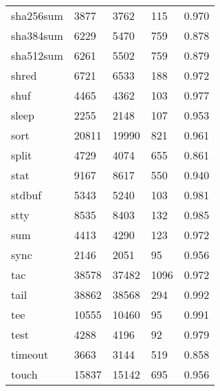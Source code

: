 \begin{longtable}{lp{3.0cm}p{3.0cm}p{3.0cm}p{3.0cm}}
sha256sum &                     3877 &         3762 &           115 &                    0.970 \\
sha384sum &                     6229 &         5470 &           759 &                    0.878 \\
sha512sum &                     6261 &         5502 &           759 &                    0.879 \\
shred     &                     6721 &         6533 &           188 &                    0.972 \\
shuf      &                     4465 &         4362 &           103 &                    0.977 \\
sleep     &                     2255 &         2148 &           107 &                    0.953 \\
sort      &                    20811 &        19990 &           821 &                    0.961 \\
split     &                     4729 &         4074 &           655 &                    0.861 \\
stat      &                     9167 &         8617 &           550 &                    0.940 \\
stdbuf    &                     5343 &         5240 &           103 &                    0.981 \\
stty      &                     8535 &         8403 &           132 &                    0.985 \\
sum       &                     4413 &         4290 &           123 &                    0.972 \\
sync      &                     2146 &         2051 &            95 &                    0.956 \\
tac       &                    38578 &        37482 &          1096 &                    0.972 \\
tail      &                    38862 &        38568 &           294 &                    0.992 \\
tee       &                    10555 &        10460 &            95 &                    0.991 \\
test      &                     4288 &         4196 &            92 &                    0.979 \\
timeout   &                     3663 &         3144 &           519 &                    0.858 \\
touch     &                    15837 &        15142 &           695 &                    0.956 \\

\end{longtable}

